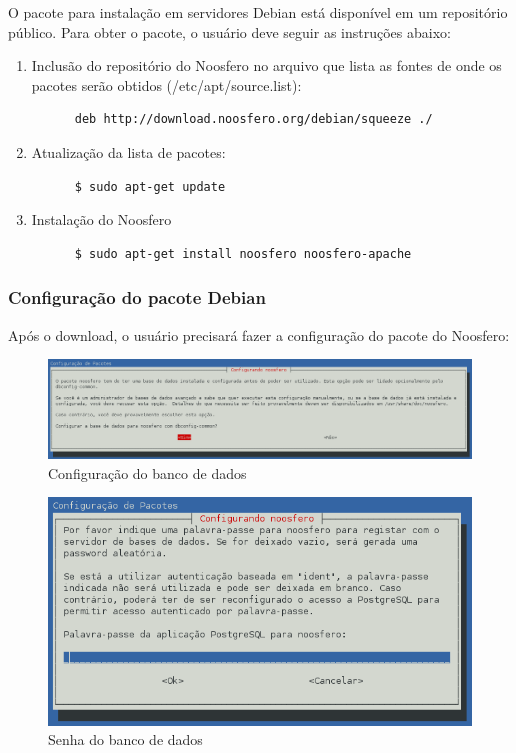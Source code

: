 \documentclass[[a4paper,11pt]{article}
\begin{document}
O pacote para instalação em servidores Debian está disponível em um
repositório público. Para obter o pacote, o usuário
deve seguir as instruções abaixo:

\begin{enumerate}
  \item Inclusão do repositório do Noosfero no arquivo que lista as fontes de onde
os pacotes serão obtidos (/etc/apt/source.list):
    \begin{verbatim}
      deb http://download.noosfero.org/debian/squeeze ./
    \end{verbatim}
  \item Atualização da lista de pacotes:
    \begin{verbatim}
      $ sudo apt-get update
    \end{verbatim}
  \item Instalação do Noosfero
    \begin{verbatim}
      $ sudo apt-get install noosfero noosfero-apache
    \end{verbatim}
\end{enumerate}

\subsubsection{Configuração do pacote Debian}

Após o download, o usuário precisará fazer a configuração do
pacote do Noosfero:

\begin{figure}[h]
\center
\includegraphics[scale=0.3]{1-db-common.png}
\caption{Configuração do banco de dados}
\label{fig:noosfero-db-common}
\end{figure}

\begin{figure}[h]
\center
\includegraphics[scale=0.4]{password-2.png}
\caption{Senha do banco de dados}
\label{fig:noosfero-password}
\end{figure}
\end{document}

